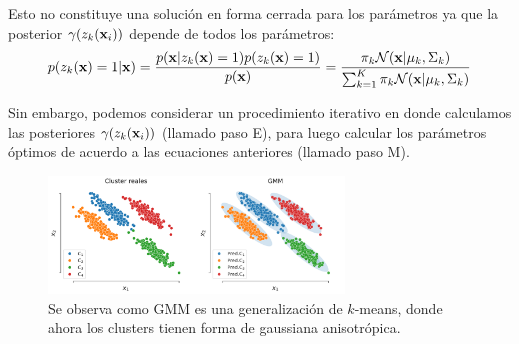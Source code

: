 \documentclass[9pt]{beamer}
\begin{document}
\begin{frame}
Esto no constituye una solución en forma cerrada para los parámetros ya que la posterior $\gamma(z_k(\mathbf{x}_i))$ depende de todos los parámetros:
\begin{align*}
	p(z_k(\mathbf{x})=1|\mathbf{x}) = \frac{p(\mathbf{x}|z_k(\mathbf{x})=1)p(z_k(\mathbf{x})=1)}{p(\mathbf{x})} = \frac{\pi_k {\mathcal N}(\mathbf{x}|\mu_k,\Sigma_k)}{\sum_{k=1}^K \pi_k {\mathcal N}(\mathbf{x}|\mu_k,\Sigma_k)} 
\end{align*} 
\pause

Sin embargo, podemos considerar un procedimiento iterativo en donde calculamos las posteriores $\gamma(z_k(\mathbf{x}_i))$ (llamado paso E), para luego calcular los parámetros óptimos de acuerdo a las ecuaciones anteriores (llamado paso M). \pause

\begin{figure}[ht]
  \centering
  \includegraphics[width=0.7\textwidth]{../img/cap6_gmm}
  \caption{Se observa como GMM es una generalización de $k$-means, donde ahora los clusters tienen forma de gaussiana anisotrópica.}
  \label{fig:gmm}
\end{figure}

\end{frame}
\end{document}
